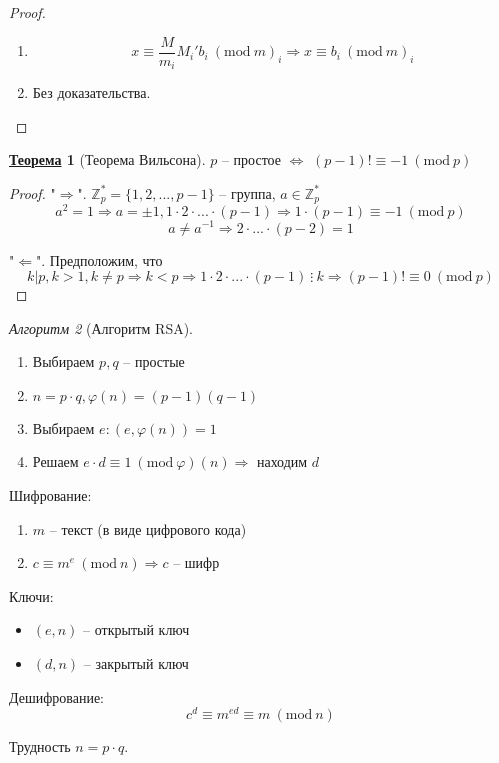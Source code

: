 \documentclass[12pt]{article}
\newenvironment{MyList}[1][4pt]{
  \begin{enumerate}[1.]
  \setlength{\parskip}{0pt}
  \setlength{\itemsep}{#1}
}{       
  \end{enumerate}
}
\newenvironment{MyItemize}[1][4pt]{
  \begin{itemize}
  \setlength{\parskip}{0pt}
  \setlength{\itemsep}{#1}
}{       
  \end{itemize}
}
\def\Z{\mathbb{Z}}       %
\def\SO{\Rightarrow}     %
\def\EQ{\Leftrightarrow} %
\theoremstyle{definition} %
\newtheorem{Thm}{\underline{Теорема}}[subsection] %
\theoremstyle{plain} %
\theoremstyle{remark} %
\newtheorem{Algo}[Thm]{Алгоритм} %
\newcommand{\Mod}[1]{\ (\mathrm{mod}\ #1)}
\begin{document}
\begin{proof}
    \begin{MyList}
        Подставим в $i$-е уравнение: 
        \item \[x \equiv \frac{M}{m_i} M_i' b_i \Mod m_i \SO x \equiv b_i \Mod m_i\]
        \item Без доказательства.
    \end{MyList}
\end{proof}

\begin{Thm}[Теорема Вильсона]
    $p$ -- простое $\EQ$ $(p - 1)! \equiv -1 \Mod p$  
\end{Thm}

\begin{proof}
    "$\SO$". $\Z_p^* = \{1, 2, ..., p - 1\}$ -- группа, $a \in \Z_p^*$
    \[a^2 = 1 \SO a = \pm 1, 1 \cdot 2 \cdot ... \cdot (p - 1) \SO 1 \cdot (p - 1) \equiv -1 \Mod p\]
    \[a \neq a^{-1} \SO 2 \cdot ... \cdot (p - 2) = 1\]
    
    "$\Leftarrow$". Предположим, что $$k | p, k > 1, k \neq p \SO k < p \SO 1 \cdot 2 \cdot ... \cdot (p - 1) \ \vdots \ k \SO (p - 1)! \equiv 0 \Mod p$$ 
\end{proof}

\begin{Algo}[Алгоритм RSA]
    \begin{MyList}
        \item Выбираем $p, q$ -- простые
        \item $n = p \cdot q, \varphi(n) = (p - 1)(q - 1)$
        \item Выбираем $e : (e, \varphi(n)) = 1$
        \item Решаем $e \cdot d \equiv 1 \Mod \varphi(n) \SO$ находим $d$  
    \end{MyList}

    Шифрование:
    \begin{MyList}
        \item $m$ -- текст (в виде цифрового кода)
        \item $c \equiv m^e \Mod n \SO c$ -- шифр
    \end{MyList}

    Ключи:
    \begin{MyItemize}
        \item $(e, n)$ -- открытый ключ
        \item $(d, n)$ -- закрытый ключ
    \end{MyItemize}

    Дешифрование:
    \[c^d \equiv m^{ed} \equiv m \Mod n\]

    Трудность $n = p \cdot q$. 
\end{Algo}
\end{document}
